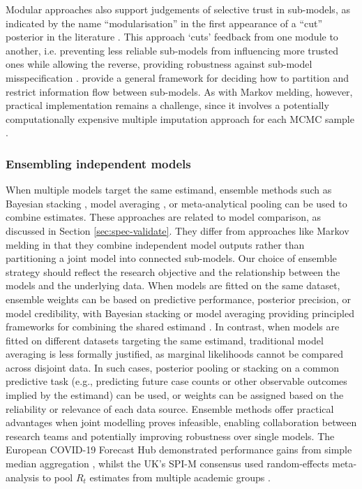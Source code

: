 \documentclass{article}
\begin{document}
Modular approaches also support judgements of selective trust in sub-models, as indicated by the name ``modularisation'' in the first appearance of a ``cut'' posterior in the literature \citep{LiuEtAl2009}. This approach `cuts' feedback from one module to another, i.e. preventing less reliable sub-models from influencing more trusted ones while allowing the reverse, providing robustness against sub-model misspecification \citep{plummer2015cuts,carmona2022scalable,yu2023variational}. \citet{liu2025general} provide a general framework for deciding how to partition and restrict information flow between sub-models. As with Markov melding, however, practical implementation remains a challenge, since it involves a potentially computationally expensive multiple imputation approach for each MCMC sample \citep{plummer2015cuts}.

\subsubsection{Ensembling independent models}\label{sec:ensembling}

When multiple models target the same estimand, ensemble methods such as Bayesian stacking \citep{yao2018using}, model averaging \citep{hoeting1999bayesian}, or meta-analytical pooling \citep{jackson2011multivariate} can be used to combine estimates.
These approaches are related to model comparison, as discussed in Section \ref{sec:spec-validate}.
They differ from approaches like Markov melding in that they combine independent model outputs rather than partitioning a joint model into connected sub-models. Our choice of ensemble strategy should reflect the research objective and the relationship between the models and the underlying data. When models are fitted on the same dataset, ensemble weights can be based on predictive performance, posterior precision, or model credibility, with Bayesian stacking or model averaging providing principled frameworks for combining the shared estimand \citep{yao2018using}. In contrast, when models are fitted on different datasets targeting the same estimand, traditional model averaging is less formally justified, as marginal likelihoods cannot be compared across disjoint data. In such cases, posterior pooling or stacking on a common predictive task (e.g., predicting future case counts or other observable outcomes implied by the estimand) can be used, or weights can be assigned based on the reliability or relevance of each data source. Ensemble methods offer practical advantages when joint modelling proves infeasible, enabling collaboration between research teams and potentially improving robustness over single models.
The European COVID-19 Forecast Hub demonstrated performance gains from simple median aggregation \citep{sherratt2021exploring}, whilst the UK's SPI-M consensus used random-effects meta-analysis to pool $R_t$ estimates from multiple academic groups \citep{manley2024combining}.
\end{document}

